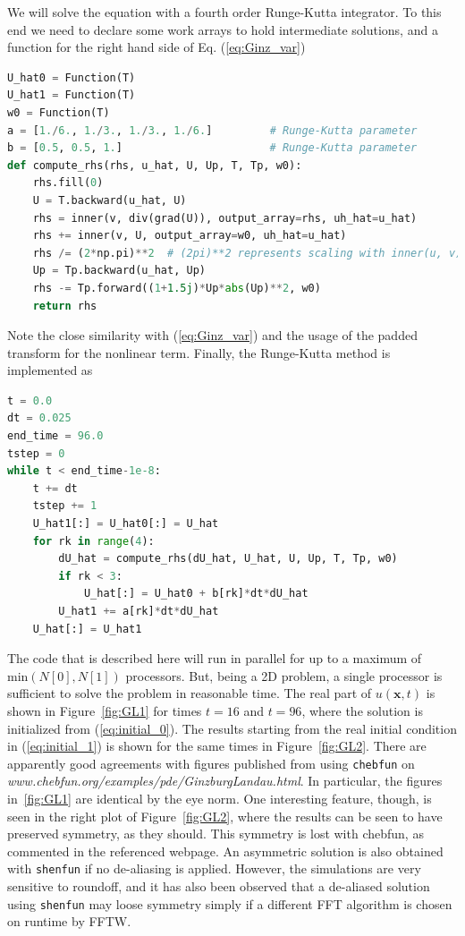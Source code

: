 \documentclass[%
oneside,                 %
final,                   %
10pt]{article}
\theoremstyle{definition}
\begin{document}
We will solve the equation with a fourth order Runge-Kutta integrator. To this end we need to declare some work arrays to hold intermediate solutions, and a function for the right hand side of Eq. (\ref{eq:Ginz_var})
\begin{lstlisting}[language=Python,style=yellow2_fb]
U_hat0 = Function(T)
U_hat1 = Function(T)
w0 = Function(T)
a = [1./6., 1./3., 1./3., 1./6.]         # Runge-Kutta parameter
b = [0.5, 0.5, 1.]                       # Runge-Kutta parameter
def compute_rhs(rhs, u_hat, U, Up, T, Tp, w0):
    rhs.fill(0)
    U = T.backward(u_hat, U)
    rhs = inner(v, div(grad(U)), output_array=rhs, uh_hat=u_hat)
    rhs += inner(v, U, output_array=w0, uh_hat=u_hat)
    rhs /= (2*np.pi)**2  # (2pi)**2 represents scaling with inner(u, v)
    Up = Tp.backward(u_hat, Up)
    rhs -= Tp.forward((1+1.5j)*Up*abs(Up)**2, w0)
    return rhs
\end{lstlisting}
Note the close similarity with (\ref{eq:Ginz_var}) and the usage of the padded transform for the nonlinear term.
Finally, the Runge-Kutta method is implemented as
\begin{lstlisting}[language=Python,style=yellow2_fb]
t = 0.0
dt = 0.025
end_time = 96.0
tstep = 0
while t < end_time-1e-8:
    t += dt
    tstep += 1
    U_hat1[:] = U_hat0[:] = U_hat
    for rk in range(4):
        dU_hat = compute_rhs(dU_hat, U_hat, U, Up, T, Tp, w0)
        if rk < 3:
            U_hat[:] = U_hat0 + b[rk]*dt*dU_hat
        U_hat1 += a[rk]*dt*dU_hat
    U_hat[:] = U_hat1
\end{lstlisting}
The code that is described here will run in parallel for up to a maximum of $\text{min}(N[0], N[1])$ processors. But, being a 2D problem, a single processor is sufficient to solve the problem in reasonable time. The real part of $u(\boldsymbol{x}, t)$ is shown in Figure~\ref{fig:GL1} for times $t=16$ and $t=96$, where the solution is initialized from (\ref{eq:initial_0}). The results starting from the real initial condition in (\ref{eq:initial_1}) is shown for the same times in Figure~\ref{fig:GL2}. There are apparently good agreements with figures published from using \texttt{chebfun} on \emph{www.chebfun.org/examples/pde/GinzburgLandau.html}. In particular, the figures in~\ref{fig:GL1}  are identical by the eye norm. One interesting feature, though, is seen in the right plot of Figure~\ref{fig:GL2}, where the results can be seen to have preserved symmetry, as they should. This symmetry is lost with chebfun, as commented in the referenced webpage. An asymmetric solution is also obtained with \texttt{shenfun} if no de-aliasing is applied. However, the simulations are very sensitive to roundoff, and it has also been observed that a de-aliased solution using \texttt{shenfun} may loose symmetry simply if a different FFT algorithm is chosen on runtime by FFTW.
\end{document}
